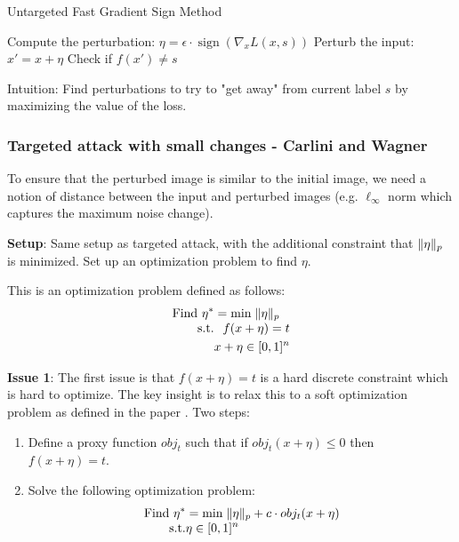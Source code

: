 \documentclass[11pt]{article}
\begin{document}
\begin{algorithm}
\caption{Untargeted Fast Gradient Sign Method}
\begin{algorithmic}[1]
\State Compute the perturbation: $\eta = \epsilon \cdot \operatorname{sign}(\nabla_x L(x, s))$
\State Perturb the input: $x' = x + \eta$
\State Check if $f(x') \neq s$ 
\end{algorithmic}
\end{algorithm}

\begin{note}
	Intuition: Find perturbations to try to "get away" from current label $s$ by maximizing the value of the loss. 
\end{note}

\subsubsection{Targeted attack with small changes - Carlini and Wagner}
To ensure that the perturbed image is similar to the initial image, we need a notion of distance between the input and perturbed images (e.g. $\ell_\infty$ norm which captures the maximum noise change). 

\textbf{Setup}: Same setup as targeted attack, with the additional constraint that $\lVert \eta \rVert_p$ is minimized. Set up an optimization problem to find $\eta$.

This is an optimization problem defined as follows:
\[
  \optprob{Find $\eta^*$}{\min}{\norm{\eta}_p}[%
    f(x+\eta) = t \\ x + \eta \in [0, 1]^n
  ]
\]

\textbf{Issue 1}: The first issue is that $f(x + \eta) = t$ is a hard discrete constraint which is hard to optimize. The key insight is to relax this to a soft optimization problem as defined in the paper \cite{carlini2017towards}. Two steps:
\begin{enumerate}
	\item Define a proxy function $obj_t$ such that if $obj_t(x + \eta) \leq 0$ then $f(x + \eta) = t$.
	\item Solve the following optimization problem:
	\[
	  \optprob{Find $\eta^*$}{\min}{\norm{\eta}_p + c \cdot obj_t(x + \eta)}[%
	    \eta \in [0, 1]^n
	  ]
	\]
\end{enumerate} 
\end{document}
